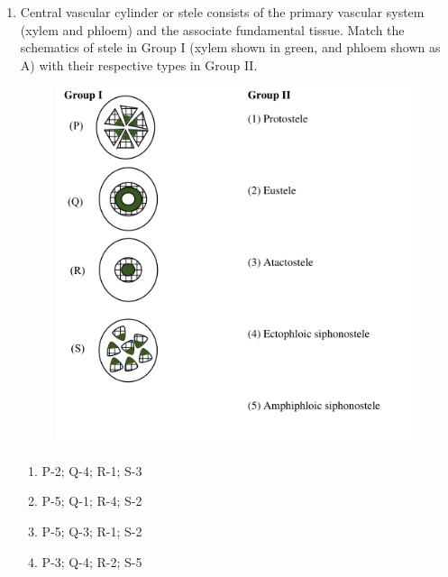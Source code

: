 \documentclass[journal,12pt,onecolumn]{IEEEtran}
\begin{document}
\begin{enumerate}
    \item 
    Central vascular cylinder or stele consists of the primary vascular system (xylem and phloem) and the associate fundamental tissue. Match the schematics of stele in Group I (xylem shown in green, and phloem shown as A) with their respective types in Group II.
   \begin{figure}[H]
		\centering
             \includegraphics{58}
		    \caption*{}
		\label{fig:Q58}
	\end{figure} 
    \begin{enumerate}
        \item P-2; Q-4; R-1; S-3
        \item P-5; Q-1; R-4; S-2
        \item P-5; Q-3; R-1; S-2
        \item P-3; Q-4; R-2; S-5
    \end{enumerate}


\end{enumerate}
\end{document}
